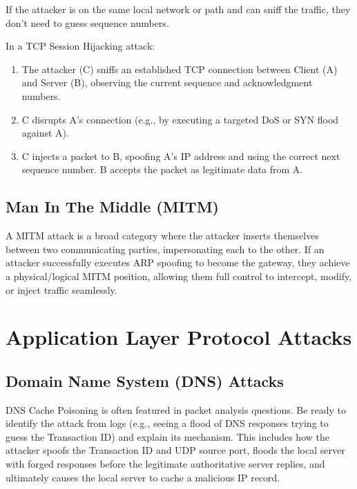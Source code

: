 If the attacker is on the same local network or path and can sniff the traffic, they don't need to guess sequence numbers. 

In a TCP Session Hijacking attack:
\begin{enumerate}
    \item The attacker (C) sniffs an established TCP connection between Client (A) and Server (B), observing the current sequence and acknowledgment numbers.
    \item C disrupts A's connection (e.g., by executing a targeted DoS or SYN flood against A).
    \item C injects a packet to B, spoofing A's IP address and using the correct next sequence number. B accepts the packet as legitimate data from A.
\end{enumerate}

\subsection{Man In The Middle (MITM)}
A MITM attack is a broad category where the attacker inserts themselves between two communicating parties, impersonating each to the other. If an attacker successfully executes ARP spoofing to become the gateway, they achieve a physical/logical MITM position, allowing them full control to intercept, modify, or inject traffic seamlessly.

\section{Application Layer Protocol Attacks}

\subsection{Domain Name System (DNS) Attacks}

\begin{tcolorbox}[colback=blue!5!white,colframe=blue!75!black,title=Exam Insight]
DNS Cache Poisoning is often featured in packet analysis questions. Be ready to identify the attack from logs (e.g., seeing a flood of DNS responses trying to guess the Transaction ID) and explain its mechanism. This includes how the attacker spoofs the Transaction ID and UDP source port, floods the local server with forged responses before the legitimate authoritative server replies, and ultimately causes the local server to cache a malicious IP record.
\end{tcolorbox}

